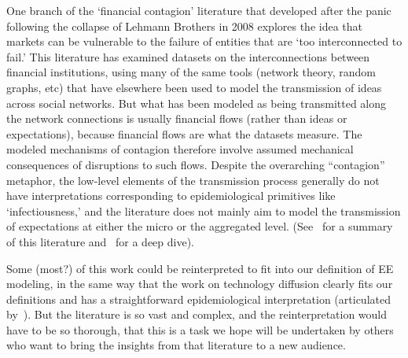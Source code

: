 
One branch of the `financial contagion' literature that developed after the panic following the collapse of Lehmann Brothers in 2008 explores the idea that markets can be vulnerable to the failure of entities that are `too interconnected to fail.' This literature has examined datasets on the interconnections between financial institutions, using many of the same tools (network theory, random graphs, etc) that have elsewhere been used to model the transmission of ideas across social networks.  But what has been modeled as being transmitted along the network connections is usually financial flows (rather than ideas or expectations), because financial flows are what the datasets measure.  The modeled mechanisms of contagion therefore involve assumed mechanical consequences of disruptions to such flows.  Despite the overarching ``contagion'' metaphor, the low-level elements of the transmission process generally do not have interpretations corresponding to epidemiological primitives like `infectiousness,' and the literature does not mainly aim to model the transmission of expectations at either the micro or the aggregated level.  (See~\cite{glasserman2016contagion} for a summary of this literature and~\cite{cabrales2015financial} for a deep dive).

Some (most?) of this work could be reinterpreted to fit into our definition of EE modeling, in the same way that the work on technology diffusion clearly fits our definitions and has a straightforward epidemiological interpretation (articulated by~\cite{arrow_classificatory_1969}).  But the literature is so vast and complex, and the reinterpretation would have to be so thorough, that this is a task we hope will be undertaken by others who want to bring the insights from that literature to a new audience.

